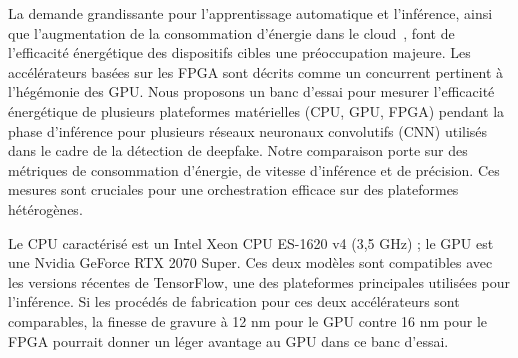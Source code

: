 \begin{table}[!ht]
    \caption{Caractérisation des plateformes d'exécution.}
    \begin{center}
    \end{center}
    \label{table:herofake-platforms}
\end{table}

La demande grandissante pour l'apprentissage automatique et l'inférence, ainsi que l'augmentation de la consommation d'énergie dans le cloud~\cite{masanetRecalibratingGlobalData2020}, font de l'efficacité énergétique des dispositifs cibles une préoccupation majeure. Les accélérateurs basées sur les FPGA sont décrits comme un concurrent pertinent à l'hégémonie des GPU. Nous proposons un banc d'essai pour mesurer l'efficacité énergétique de plusieurs plateformes matérielles (CPU, GPU, FPGA) pendant la phase d'inférence pour plusieurs réseaux neuronaux convolutifs (CNN) utilisés dans le cadre de la détection de deepfake. Notre comparaison porte sur des métriques de consommation d'énergie, de vitesse d'inférence et de précision. Ces mesures sont cruciales pour une orchestration efficace sur des plateformes hétérogènes.

Le CPU caractérisé est un Intel Xeon CPU ES-1620 v4 (3,5 GHz) ; le GPU est une Nvidia GeForce RTX 2070 Super. Ces deux modèles sont compatibles avec les versions récentes de TensorFlow, une des plateformes principales utilisées pour l'inférence. Si les procédés de fabrication pour ces deux accélérateurs sont comparables, la finesse de gravure à 12 nm pour le GPU contre 16 nm pour le FPGA pourrait donner un léger avantage au GPU dans ce banc d'essai.

